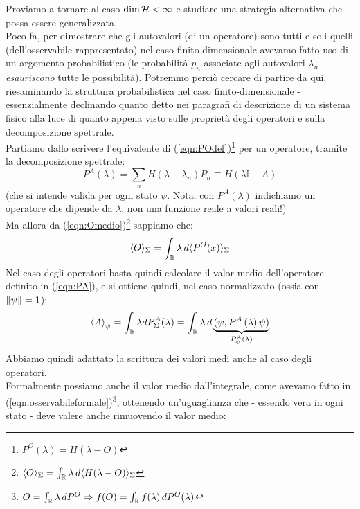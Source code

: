 \documentclass[../../FisicaTeorica.tex]{subfiles}
\begin{document}
Proviamo a tornare al caso $\operatorname{dim}\mathcal{H} < \infty$ e studiare una strategia alternativa che possa essere generalizzata.\\
Poco fa, per dimostrare che gli autovalori  (di un operatore) sono tutti e soli quelli  (dell'osservabile rappresentato) nel caso finito-dimensionale avevamo fatto uso di un argomento probabilistico (le probabilità $p_n$ associate agli autovalori $\lambda_n$ \textit{esauriscono} tutte le possibilità). Potremmo perciò cercare di partire da qui, riesaminando la struttura probabilistica nel caso finito-dimensionale - essenzialmente declinando quanto detto nei paragrafi di descrizione di un sistema fisico %
alla luce di quanto appena visto sulle proprietà degli operatori e sulla decomposizione spettrale.\\
Partiamo dallo scrivere l'equivalente di (\ref{eqn:POdef})\footnote{$P^O(\lambda) = H(\lambda-O)$} per un operatore, tramite la decomposizione spettrale: %
\begin{equation} 
P^A\left(\lambda\right)=\sum_{n}{H\left(\lambda-\lambda_n\right)P_n}\equiv H(\lambda \mathbb{I} - A) 
\label{eqn:PA}
\end{equation}
(che si intende valida per ogni stato $\psi$. Nota: con $P^A(\lambda)$ indichiamo un operatore che dipende da $\lambda$, non una funzione reale a valori reali!)\\
Ma allora da (\ref{eqn:Omedio})\footnote{$\langle O \rangle_\Sigma = \int_{\mathbb{R}} \lambda\, d\langle H(\lambda-O)\rangle_\Sigma$} sappiamo che: %
\[
\langle O \rangle_\Sigma = \int_{\mathbb{R}} \lambda\, d\langle P^O(x)\rangle_\Sigma 
\]
Nel caso degli operatori basta quindi calcolare il valor medio dell'operatore definito in (\ref{eqn:PA}), e si ottiene quindi, nel caso normalizzato (ossia con $\left\lVert\psi\right\rVert = 1$):
\begin{equation}
\left\langle A\right\rangle_\psi= \int_{\mathbb{R}} \lambda dP^A_\Sigma(\lambda) =\int_{\mathbb{R}}{\lambda\, d \underbrace{(\psi,P^A\left(\lambda\right)\psi)}_{P_\psi^A(\lambda)}}
\label{eqn:valormedioA}
\end{equation}
Abbiamo quindi adattato la scrittura  dei valori medi anche al caso degli operatori.\\
Formalmente possiamo anche  il valor medio dall'integrale, come avevamo fatto in (\ref{eqn:osservabileformale})\footnote{$O = \int_{\mathbb{R}} \lambda\, dP^O \Rightarrow f(O) = \int_{\mathbb{R}} f(\lambda)\, dP^O(\lambda)$}, ottenendo un'uguaglianza che - essendo vera in ogni stato - deve valere anche rimuovendo il valor medio: %
\end{document}
